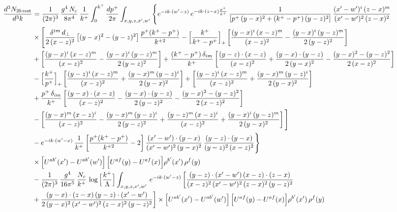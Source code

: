\documentclass[9pt]{article}
\numberwithin{equation}{section}
\begin{document}
\begin{align}
\frac{d^{3}N_{2b\,\rm rest}}{d^{3}k} & =\frac{1}{(2\pi)^{3}}\,\frac{g^{4}\,N_{c}}{8\pi^{4}}\,\frac{1}{k^{+}}\int_{0}^{k^{+}}\frac{dp^{+}}{2\pi}\int_{x,y,z,x',w'}\Bigg\{e^{-ik\cdot(w'-z)}\,e^{-ik\cdot(z-x)\frac{p^{+}}{k^{+}}}\,\frac{1}{\left[p^{+}\,(y-x)^{2}+(k^{+}-p^{+})\,(y-z)^{2}\right]}\,\frac{(x'-w')^{i}\,(z-x)^{m}}{(x'-w')^{2}\,(z-x)^{2}}\notag\\
&\times\Bigg[\frac{\delta^{im}\,d_{\perp}}{2\,(x-z)^{2}}\left[(y-x)^{2}-(y-z)^{2}\right]\frac{p^{+}(k^{+}-p^{+})}{k^{+2}}
-\Big[\frac{k^{+}}{k^{+}-p^{+}}\Big]_{+}\left[\frac{(y-x)^{i}\,(x-z)^{m}}{(x-z)^{2}}-\frac{(y-x)^{i}\,(y-z)^{m}}{2\,(y-z)^{2}}\right]\notag\\
&+\left[\frac{(y-x)^{i}\,(x-z)^{m}}{(x-z)^{2}}-\frac{(y-x)^{i}\,(y-z)^{m}}{2\,(y-z)^{2}}\right]
+\frac{(k^{+}-p^{+})\,\delta_{im}}{k^{+}}\left[\frac{(y-z)\cdot(x-z)}{(x-z)^{2}}+\frac{(y-x)\cdot(y-z)}{2\,(y-x)^{2}}-\frac{(y-x)^{2}-(y-z)^{2}}{2\,(x-z)^{2}}\right]\notag\\
&-\Big[\frac{k^{+}}{p^{+}}\Big]_{+}\left[\frac{(y-z)^{i}\,(x-z)^{m}}{(x-z)^{2}}+\frac{(y-x)^{m}\,(y-z)^{i}}{2\,(y-x)^{2}}\right]+\left[\frac{(y-z)^{i}\,(x-z)^{m}}{(x-z)^{2}}+\frac{(y-x)^{m}\,(y-z)^{i}}{2\,(y-x)^{2}}\right]\notag\\
&+\frac{p^{+}\,\delta_{im}}{k^{+}}\left[\frac{(y-x)\cdot(x-z)}{(x-z)^{2}}-\frac{(y-x)\cdot(y-z)}{2\,(y-z)^{2}}-\frac{(y-x)^{2}-(y-z)^{2}}{2\,(x-z)^{2}}\right]\notag\\
&-\left[\frac{(y-x)^{m}\,(x-z)^{i}}{(x-z)^{2}}-\frac{(y-x)^{m}\,(y-z)^{i}}{2\,(y-z)^{2}}+\frac{(y-z)^{m}\,(x-z)^{i}}{(x-z)^{2}}+\frac{(y-x)^{i}\,(y-z)^{m}}{2\,(y-x)^{2}}\right]\Bigg]\notag\\
&-e^{-ik\cdot(w'-x)}\,\frac{1}{k^{+}}\left[\frac{p^{+}(k^{+}-p^{+})}{k^{+2}}-2\right]\frac{(x'-w')\cdot(y-x)}{(x'-w')^{2}\,(y-x)^{2}}\,\frac{(y-z)\cdot(y-x)}{(y-z)^{2}\,(x-z)^{2}}\Bigg\}\notag\\
&\times\Big[U^{ab'}(x')-U^{ab'}(w')\Big]\,\Big[U^{af}(y)-U^{af}(x)\Big]\rho^{b'}(x')\,\rho^{f}(y)\notag \\ & -\frac{1}{(2\pi)^{3}}\,\frac{g^{4}}{16\pi^{5}}\,\frac{N_{c}}{k^{+}}\,\log\Big[\frac{k^{+}}{\Lambda}\Big]\int_{x,y,z,x',w'}\,e^{-ik\cdot(w'-z)}\,\bigg[\frac{(y-z)\cdot (x'-w')\,(x-z)\cdot (z-x)}{(x-z)^{2}\,(x'-w')^{2}\,(z-x)^{2}\,(y-z)^{2}}\notag \\ & +\frac{(y-x)\cdot (z-x)\,(y-z)\cdot (x'-w')}{2\,(y-x)^{2}\,(x'-w')^{2}\,(z-x)^{2}\,(y-z)^{2}}\bigg]\times\Big[U^{ab'}(x')-U^{ab'}(w')\Big]\,\Big[U^{af}(y)-U^{af}(x)\Big]\rho^{b'}(x')\,\rho^{f}(y)\notag\\

\end{align}
\end{document}
